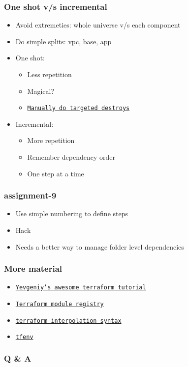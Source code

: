 \documentclass[9pt]{beamer}
\newcommand{\myblue} [1] {{\color{blue}#1}}
\begin{document}
\begin{frame}[fragile]
  \frametitle{One shot v/s incremental}
  \begin{itemize}[<+->]
    \item Avoid extremeties: whole universe v/s each component
    \item Do simple splits: vpc, base, app
    \item One shot:
      \begin{itemize}
        \item Less repetition
        \item Magical?
        \item \myblue{\href{https://www.terraform.io/docs/commands/destroy.html}{\texttt{Manually do targeted destroys}}}
      \end{itemize}
    \item Incremental:
      \begin{itemize}
        \item More repetition
        \item Remember dependency order
        \item One step at a time
      \end{itemize}
  \end{itemize}
\end{frame}

\begin{frame}[fragile]
  \frametitle{assignment-9}

  \begin{itemize}[<+->]
    \item Use simple numbering to define steps
    \item Hack
    \item Needs a better way to manage folder level dependencies
  \end{itemize}

\end{frame}


\begin{frame}[fragile]
  \frametitle{More material}

  \begin{itemize}
    \item \myblue{\href{https://blog.gruntwork.io/an-introduction-to-terraform-f17df9c6d180}{\texttt{Yevgeniy's awesome terraform tutorial}}}
    \item \myblue{\href{https://registry.terraform.io/}{\texttt{Terraform module registry}}}
    \item \myblue{\href{https://www.terraform.io/docs/configuration/interpolation.html}{\texttt{terraform interpolation syntax}}}
    \item \myblue{\href{https://github.com/kamatama41/tfenv}{\texttt{tfenv}}}
  \end{itemize}

\end{frame}

\begin{frame}[fragile]
  \frametitle{Q \& A}
\end{frame}
\end{document}
